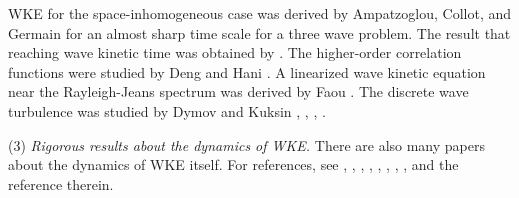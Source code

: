 WKE for the space-inhomogeneous case was derived by Ampatzoglou, Collot, and Germain \cite{ampatzoglou2021derivation} for an almost sharp time scale for a three wave problem. The result that reaching wave kinetic time was obtained by \cite{hannani2022wave}. The higher-order correlation functions were studied by Deng and Hani \cite{deng2021propagation}. A linearized wave kinetic equation near the Rayleigh-Jeans spectrum was derived by Faou \cite{faou2020linearized}. The discrete wave turbulence was studied by Dymov and Kuksin \cite{dymov2021formal}, \cite{dymov2020zakharov}, \cite{dymov2023formal}, \cite{dymov2021large}.

(3) \textit{Rigorous results about the dynamics of WKE.} There are also many papers about the dynamics of WKE itself. For references, see \cite{collot2022stability}, \cite{escobedo2015finite}, \cite{escobedo2015theory}, \cite{germain2020optimal}, \cite{gamba2020wave}, \cite{soffer2018dynamics}, \cite{rumpf2021wave}, \cite{soffer2020energy}, \cite{staffilani2023wave} and the reference therein.





